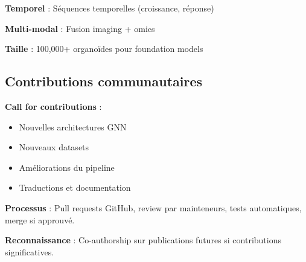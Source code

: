 \textbf{Temporel} : Séquences temporelles (croissance, réponse)

\textbf{Multi-modal} : Fusion imaging + omics

\textbf{Taille} : 100,000+ organoïdes pour foundation models

\subsection{Contributions communautaires}

\textbf{Call for contributions} :
\begin{itemize}
    \item Nouvelles architectures GNN
    \item Nouveaux datasets
    \item Améliorations du pipeline
    \item Traductions et documentation
\end{itemize}

\textbf{Processus} : Pull requests GitHub, review par mainteneurs, tests automatiques, merge si approuvé.

\textbf{Reconnaissance} : Co-authorship sur publications futures si contributions significatives.
